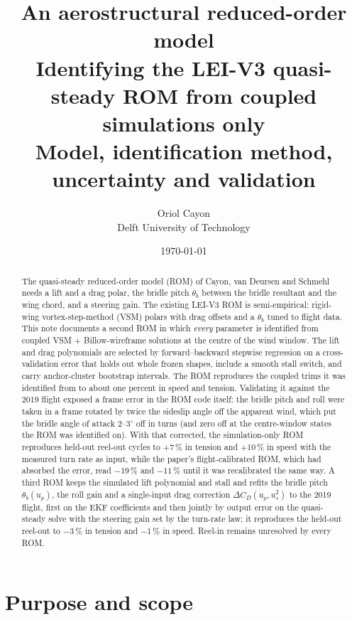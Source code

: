 \documentclass[11pt,a4paper]{article}
\title{%
  \vspace{-1.5cm}
  {\Huge\textbf{An aerostructural reduced-order model}}\\[6pt]
  {\large Identifying the LEI-V3 quasi-steady ROM from coupled simulations
   only}\\[10pt]
  {\normalsize Model, identification method, uncertainty and validation}
}
\author{Oriol Cayon \\ \small Delft University of Technology}
\date{\today}
\begin{document}
\maketitle
\thispagestyle{fancy}

\begin{abstract}
\noindent
The quasi-steady reduced-order model (ROM) of Cayon, van Deursen and
Schmehl~\cite{cayon2026rom} needs a lift and a drag polar, the bridle pitch
$\theta_b$ between the bridle resultant and the wing chord, and a steering gain.
The existing LEI-V3 ROM is semi-empirical: rigid-wing vortex-step-method (VSM)
polars with drag offsets and a $\theta_b$ tuned to flight data. This note
documents a second ROM in which \emph{every} parameter is identified from
coupled VSM + Billow-wireframe solutions at the centre of the wind window.
The lift and drag polynomials are selected by forward--backward stepwise
regression on a cross-validation error that holds out whole frozen shapes,
include a smooth stall switch, and carry anchor-cluster bootstrap intervals.
The ROM reproduces the coupled trims it was identified from to about one
percent in speed and tension. Validating it against the 2019 flight exposed a
frame error in the ROM code itself: the bridle pitch and roll were taken in a
frame rotated by twice the sideslip angle off the apparent wind, which put the
bridle angle of attack 2--3$^\circ$ off in turns (and zero off at the
centre-window states the ROM was identified on). With that corrected, the
simulation-only ROM reproduces held-out reel-out cycles to $+7\,\%$ in tension
and $+10\,\%$ in speed with the measured turn rate as input, while the
paper's flight-calibrated ROM, which had absorbed the error, read $-19\,\%$
and $-11\,\%$ until it was recalibrated the same way. A third ROM keeps the simulated lift polynomial and stall and
refits the bridle pitch $\theta_b(u_p)$, the roll gain and a single-input drag
correction $\Delta C_D(u_p,u_s^2)$ to the 2019 flight, first on the EKF
coefficients and then jointly by output error on the quasi-steady solve with
the steering gain set by the turn-rate law; it reproduces the held-out
reel-out to $-3\,\%$ in tension and $-1\,\%$ in speed. Reel-in remains
unresolved by every ROM.
\end{abstract}

\tableofcontents

\section{Purpose and scope}
\end{document}

